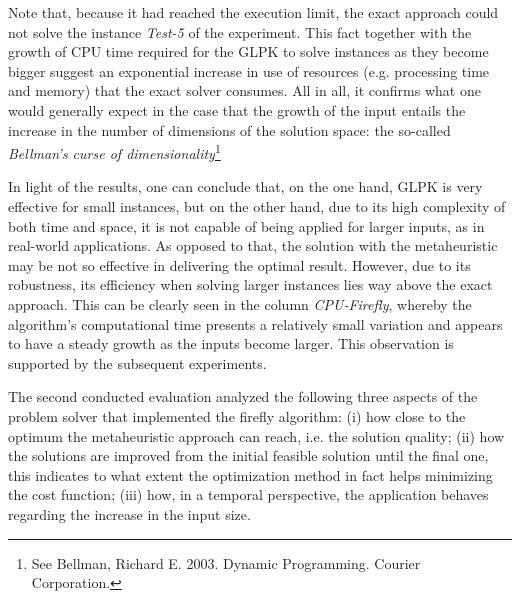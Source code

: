 \documentclass[tuberlin,cic,tc,openright,english,noabntcite,oneside]{iiufrgs}
\begin{document}
Note that, because it had reached the execution limit, the exact approach could not solve the instance \emph{Test-5} of the experiment. This fact together with the growth of CPU time required for the GLPK to solve instances as they become bigger suggest an exponential increase in use of resources (e.g. processing time and memory) that the exact solver consumes. All in all, it confirms what one would generally expect in the case that the growth of the input entails the increase in the number of dimensions of the solution space: the so-called \emph{Bellman's curse of dimensionality}\footnote{See Bellman, Richard E. 2003. Dynamic Programming.  Courier Corporation.}

In light of the results, one can conclude that, on the one hand, GLPK is very effective for small instances, but on the other hand, due to its high complexity of both time and space, it is not capable of being applied for larger inputs, as in real-world applications. As opposed to that, the solution with the metaheuristic may be not so effective in delivering the optimal result. However, due to its robustness, its efficiency when solving larger instances lies way above the exact approach. This can be clearly seen in the column \emph{CPU-Firefly}, whereby the algorithm's computational time presents a relatively small variation and appears to have a steady growth as the inputs become larger. This observation is supported by the subsequent experiments.

The second conducted evaluation analyzed the following three aspects of the problem solver that implemented the firefly algorithm: (i) how close to the optimum the metaheuristic approach can reach, i.e. the solution quality; (ii) how the solutions are improved from the initial feasible solution until the final one, this indicates to what extent the optimization method in fact helps minimizing the cost function; (iii) how, in a temporal perspective, the application behaves regarding the increase in the input size.
\end{document}

